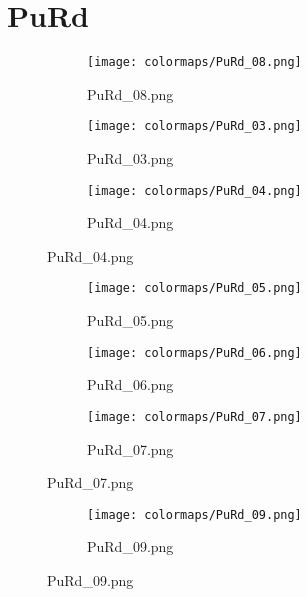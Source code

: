 \documentclass{article}%
\begin{document}
%
\newpage%
\section{PuRd}%
\label{sec:PuRd}%
\hspace{1cm}\hfill%
\hspace{1cm}\hfill%
\hspace{1cm}\hfill%


\begin{figure}[h!]%
\begin{subfigure}[b]{0.3\linewidth}%
\texttt{[image: colormaps/PuRd\_08.png]}%
\caption{PuRd\_08.png}%
\end{subfigure}%
\begin{subfigure}[b]{0.3\linewidth}%
\texttt{[image: colormaps/PuRd\_03.png]}%
\caption{PuRd\_03.png}%
\end{subfigure}%
\begin{subfigure}[b]{0.3\linewidth}%
\texttt{[image: colormaps/PuRd\_04.png]}%
\caption{PuRd\_04.png}%
\end{subfigure}%
\end{figure}

%
\hspace{1cm}\hfill%
\hspace{1cm}\hfill%
\hspace{1cm}\hfill%


\begin{figure}[h!]%
\begin{subfigure}[b]{0.3\linewidth}%
\texttt{[image: colormaps/PuRd\_05.png]}%
\caption{PuRd\_05.png}%
\end{subfigure}%
\begin{subfigure}[b]{0.3\linewidth}%
\texttt{[image: colormaps/PuRd\_06.png]}%
\caption{PuRd\_06.png}%
\end{subfigure}%
\begin{subfigure}[b]{0.3\linewidth}%
\texttt{[image: colormaps/PuRd\_07.png]}%
\caption{PuRd\_07.png}%
\end{subfigure}%
\end{figure}

%
\hspace{1cm}\hfill%


\begin{figure}[h!]%
\begin{subfigure}[b]{0.3\linewidth}%
\texttt{[image: colormaps/PuRd\_09.png]}%
\caption{PuRd\_09.png}%
\end{subfigure}%
\end{figure}
\end{document}
